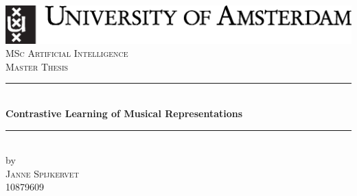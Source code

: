 \begin{titlepage}
    \begin{fullwidth}
        \newcommand{\HRule}{\rule{\linewidth}{0.5mm}} %
        \center %
        
        
        \includegraphics[width=\linewidth]{images/uvalogo_regular_p_en.eps}\\[2.5cm]
        \textsc{\Large MSc Artificial Intelligence}\\[0.2cm]
        \textsc{\Large Master Thesis}\\[0.5cm] 
        
        
        \HRule \\[0.4cm]
        { \huge \bfseries Contrastive Learning of Musical Representations}\\[0.4cm] %
        \HRule \\[0.5cm]
        
        
        by\\[0.2cm]
        \textsc{\Large Janne Spijkervet}\\[0.2cm] %
        10879609\\[1cm]
        
        
        

\end{fullwidth}
\end{titlepage}
